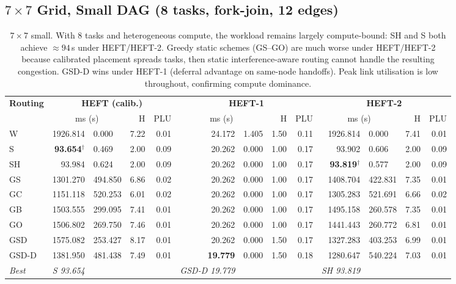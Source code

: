 \documentclass[11pt]{article}
\newcommand{\win}[1]{\textcolor{green!50!black}{\textbf{#1}}}
\newcommand{\bad}[1]{\textcolor{red!70!black}{#1}}
\begin{document}
\subsection{$7\times7$ Grid, Small DAG (8 tasks, fork-join, 12 edges)}

\begin{table}[H]
\centering
\small
\setlength{\tabcolsep}{4pt}
\begin{tabular}{l r@{$\,\pm\,$}l r r r@{$\,\pm\,$}l r r r@{$\,\pm\,$}l r r}
\toprule
\textbf{Routing} & \multicolumn{4}{c}{\textbf{HEFT (calib.)}} & \multicolumn{4}{c}{\textbf{HEFT-1}} & \multicolumn{4}{c}{\textbf{HEFT-2}} \\
\cmidrule(lr){2-5}\cmidrule(lr){6-9}\cmidrule(lr){10-13}
 & \multicolumn{2}{c}{ms (s)} & H & PLU & \multicolumn{2}{c}{ms (s)} & H & PLU & \multicolumn{2}{c}{ms (s)} & H & PLU \\
\midrule
W & \bad{1926.814} & 0.000 & 7.22 & 0.01 & \bad{24.172} & 1.405 & 1.50 & 0.11 & \bad{1926.814} & 0.000 & 7.41 & 0.01 \\
S & \textbf{93.654}$^\dagger$ & 0.469 & 2.00 & 0.09 & 20.262 & 0.000 & 1.00 & 0.17 & 93.902 & 0.606 & 2.00 & 0.09 \\
SH & 93.984 & 0.624 & 2.00 & 0.09 & 20.262 & 0.000 & 1.00 & 0.17 & \textbf{93.819}$^\dagger$ & 0.577 & 2.00 & 0.09 \\
GS & 1301.270 & 494.850 & 6.86 & 0.02 & 20.262 & 0.000 & 1.00 & 0.17 & 1408.704 & 422.831 & 7.35 & 0.01 \\
GC & 1151.118 & 520.253 & 6.01 & 0.02 & 20.262 & 0.000 & 1.00 & 0.17 & 1305.283 & 521.691 & 6.66 & 0.02 \\
GB & 1503.555 & 299.095 & 7.41 & 0.01 & 20.262 & 0.000 & 1.00 & 0.17 & 1495.158 & 260.578 & 7.35 & 0.01 \\
GO & 1506.802 & 269.750 & 7.46 & 0.01 & 20.262 & 0.000 & 1.00 & 0.17 & 1441.443 & 260.772 & 6.81 & 0.01 \\
GSD & 1575.082 & 253.427 & 8.17 & 0.01 & 20.262 & 0.000 & 1.50 & 0.17 & 1327.283 & 403.253 & 6.99 & 0.01 \\
GSD\mbox{-}D & 1381.950 & 481.438 & 7.49 & 0.01 & \win{19.779} & 0.000 & 1.50 & 0.18 & 1280.647 & 540.224 & 7.03 & 0.01 \\
\midrule
\textit{Best} & \textit{S 93.654} &  &  &  & \textit{GSD-D 19.779} &  &  &  & \textit{SH 93.819} &  &  &  \\
\bottomrule
\end{tabular}
\caption{$7\times7$ small. With 8 tasks and heterogeneous compute, the workload remains largely compute-bound: SH and S both achieve $\approx94$\,s under HEFT/HEFT-2. Greedy static schemes (GS--GO) are much worse under HEFT/HEFT-2 because calibrated placement spreads tasks, then static interference-aware routing cannot handle the resulting congestion. GSD-D wins under HEFT-1 (deferral advantage on same-node handoffs). Peak link utilisation is low throughout, confirming compute dominance.}
\end{table}
\end{document}
